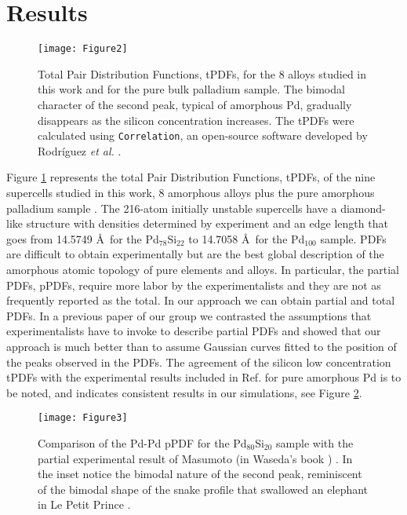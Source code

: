 \documentclass[fleqn,12pt]{wlscirep}
\begin{document}
\section*{Results}

\begin{figure}[H]
\centering
\texttt{[image: Figure2]}
\caption{Total Pair Distribution Functions, tPDFs, for the 8 alloys studied in this work and for the pure bulk palladium sample. The bimodal character of the second peak, typical of amorphous Pd, gradually disappears as the silicon concentration increases. The tPDFs were calculated using \texttt{Correlation}, an open-source software developed by Rodr\'{i}guez \textit{et al.} \cite{Correlation_2021}.}
\label{fig:Fig2}
\end{figure}

Figure \ref{fig:Fig2} represents the total Pair Distribution Functions, tPDFs, of the nine supercells studied in this work, 8 amorphous alloys plus the pure amorphous palladium sample \cite{Rodriguez_2019}. The 216-atom initially unstable supercells have a diamond-like structure with densities determined by experiment \cite{Okamoto_1993, Fukunaga_1981, Louzguine_Luzgin_2012} and an edge length that goes from 14.5749 \AA\ for the Pd$_{78}$Si$_{22}$ to 14.7058 \AA\ for the Pd$_{100}$ sample. PDFs are difficult to obtain experimentally but are the best global description of the amorphous atomic topology of pure elements and alloys. In particular, the partial PDFs, pPDFs, require more labor by the experimentalists and they are not as frequently reported as the total. In our approach we can obtain partial and total PDFs. In a previous paper of our group \cite{Alvarez_2003} we contrasted the assumptions that experimentalists have to invoke to describe partial PDFs and showed that our approach is much better than to assume Gaussian curves fitted to the position of the peaks observed in the PDFs. The agreement of the silicon low concentration tPDFs with the experimental results included in Ref. \cite{Rodriguez_2019} for pure amorphous Pd is to be noted, and indicates consistent results in our simulations, see Figure \ref{fig:Fig3}.

\begin{figure}[H]
\centering
\texttt{[image: Figure3]}
\caption{Comparison of the Pd-Pd pPDF for the Pd$_{80}$Si$_{20}$ sample with the partial experimental result of Masumoto (in Waseda's book \cite{Waseda_1980}) \cite{Waseda_1975}. In the inset notice the bimodal nature of the second peak, reminiscent of the bimodal shape of the snake profile that swallowed an elephant in Le Petit Prince \cite{The_Little_Prince}.}
\label{fig:Fig3}
\end{figure}
\end{document}
